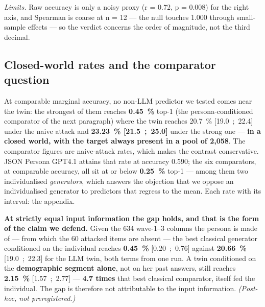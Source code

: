 \documentclass[sigconf,anonymous,review]{acmart}
\begin{document}
\textit{Limits.} Raw accuracy is only a noisy proxy (r = 0.72, p = 0.008) for the right axis, and Spearman is coarse at n = 12 --- the null touches 1.000 through small-sample effects --- so the verdict concerns the order of magnitude, not the third decimal.

\subsection{Closed-world rates and the comparator question}

At comparable marginal accuracy, no non-LLM predictor we tested comes near the twin: the strongest of them reaches \textbf{0.45~\%} top-1 (the persona-conditioned comparator of the next paragraph) where the twin reaches 20.7~\% [19.0~;~22.4] under the naive attack and \textbf{23.23~\% [21.5~;~25.0]} under the strong one --- \textbf{in a closed world, with the target always present in a pool of 2,058}. The comparator figures are naive-attack rates, which makes the contrast conservative. JSON Persona GPT4.1 attains that rate at accuracy 0.590; the six comparators, at comparable accuracy, all sit at or below \textbf{0.25~\%} top-1 --- among them two individualised \textit{generators}, which answers the objection that we oppose an individualised generator to predictors that regress to the mean. Each rate with its interval: the appendix.

\textbf{At strictly equal input information the gap holds, and that is the form of the claim we defend.} Given the 634 wave-1--3 columns the persona is made of --- from which the 60 attacked items are absent --- the best classical generator conditioned on the individual reaches \textbf{0.45~\%} [0.20~;~0.76] against \textbf{20.66~\%} [19.0~;~22.3] for the LLM twin, both terms from one run. A twin conditioned on the \textbf{demographic segment alone}, not on her past answers, still reaches \textbf{2.15~\%} [1.57~;~2.77] --- \textbf{4.7 times} that best classical comparator, itself fed the individual. The gap is therefore not attributable to the input information. \textit{(Post-hoc, not preregistered.)}
\end{document}
